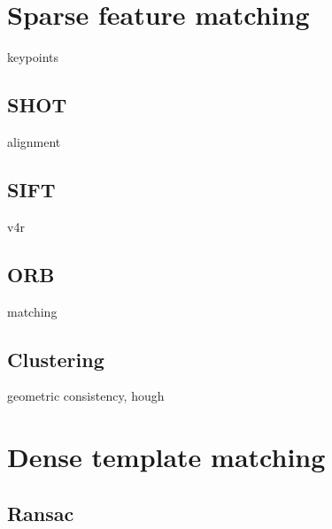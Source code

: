 


\chapter{Sparse feature matching}
\label{cha:feature}

keypoints


\section{SHOT}
\label{sec:shot}

alignment


\section{SIFT}
\label{sec:sift}

v4r


\section{ORB}
\label{sec:orb}

matching


\section{Clustering}
\label{sec:clustering}

geometric consistency, hough

\chapter{Dense template matching}
\label{cha:template}

\section{Ransac}
\label{seq:ransac}

